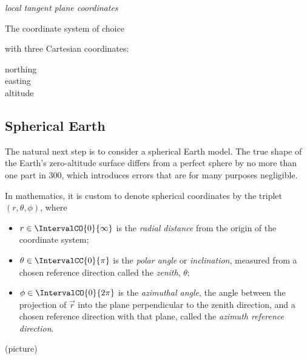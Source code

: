      \emph{local tangent plane coordinates}

     The coordinate system of choice

    with three Cartesian coordinates:
     \begin{description}
         \item[northing]
         \item[easting]
         \item[altitude]
     \end{description}



    \subsection{Spherical Earth} \label{mms}
        The natural next step is to consider a spherical Earth model.
        The true shape of the Earth's zero-altitude surface differs from
        a perfect sphere by no more than one part in 300, which introduces errors
        that are for many purposes negligible.

        In mathematics, it is custom to denote spherical coordinates by the triplet
        $(r, \theta, \phi)$, where
        \begin{itemize}
            \item $r \in \IntervalCO{0}{\infty}$ is the \emph{radial distance} from the origin of the coordinate system;
            \item $\theta \in \IntervalCC{0}{\pi}$ is the \emph{polar angle} or \emph{inclination}, measured
                from a chosen reference direction called the \textit{zenith},
                $\theta$;
            \item $\phi \in \IntervalCO{0}{2\pi}$ is the \emph{azimuthal angle}, the angle between the projection
                of $\vec{r}$ into the plane perpendicular to the zenith direction, and
                a chosen reference direction with that plane, called the \textit{azimuth reference direction}.
        \end{itemize}

        (picture)

